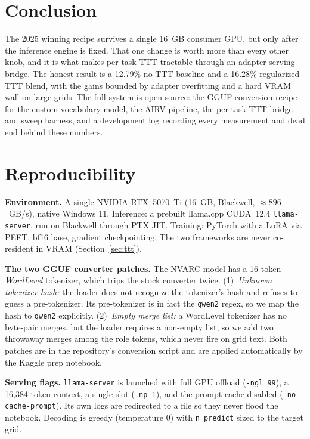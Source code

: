 \documentclass[11pt]{article}
\begin{document}
\section{Conclusion}
\label{sec:conclusion}
The 2025 winning recipe survives a single 16~GB consumer GPU, but only after the inference engine is
fixed. That one change is worth more than every other knob, and it is what makes per-task TTT
tractable through an adapter-serving bridge. The honest result is a 12.79\% no-TTT baseline and a
16.28\% regularized-TTT blend, with the gains bounded by adapter overfitting and a hard VRAM wall on
large grids. The full system is open source: the GGUF conversion recipe for the custom-vocabulary
model, the AIRV pipeline, the per-task TTT bridge and sweep harness, and a development log recording
every measurement and dead end behind these numbers.

\appendix

\section{Reproducibility}
\label{app:repro}

\textbf{Environment.} A single NVIDIA RTX~5070~Ti (16~GB, Blackwell, $\approx 896$~GB/s), native
Windows 11. Inference: a prebuilt llama.cpp CUDA~12.4 \texttt{llama-server}, run on Blackwell through
PTX JIT. Training: PyTorch with a LoRA via PEFT, bf16 base, gradient checkpointing. The two frameworks
are never co-resident in VRAM (Section~\ref{sec:ttt}).

\textbf{The two GGUF converter patches.} The NVARC model has a 16-token \emph{WordLevel} tokenizer,
which trips the stock converter twice. (1)~\emph{Unknown tokenizer hash:} the loader does not
recognize the tokenizer's hash and refuses to guess a pre-tokenizer. Its pre-tokenizer is in fact the
\texttt{qwen2} regex, so we map the hash to \texttt{qwen2} explicitly. (2)~\emph{Empty merge list:} a
WordLevel tokenizer has no byte-pair merges, but the loader requires a non-empty list, so we add two
throwaway merges among the role tokens, which never fire on grid text. Both patches are in the
repository's conversion script and are applied automatically by the Kaggle prep notebook.

\textbf{Serving flags.} \texttt{llama-server} is launched with full GPU offload
(\texttt{-ngl~99}), a 16{,}384-token context, a single slot (\texttt{-np~1}), and the prompt cache
disabled (\texttt{--no-cache-prompt}). Its own logs are redirected to a file so they never flood the
notebook. Decoding is greedy (temperature $0$) with \texttt{n\_predict} sized to the target grid.
\end{document}

